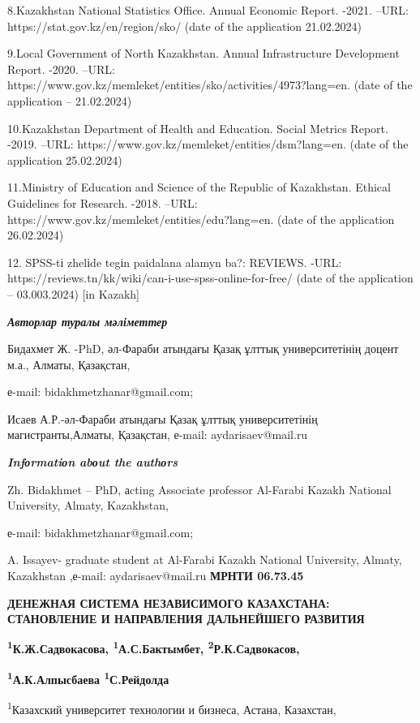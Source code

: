 8.Kazakhstan National Statistics Office. Annual Economic Report. -2021.
--URL: https://stat.gov.kz/en/region/sko/ (date of the application
21.02.2024)

9.Local Government of North Kazakhstan. Annual Infrastructure
Development Report. -2020. --URL:
https://www.gov.kz/memleket/entities/sko/activities/4973?lang=en. (date
of the application -- 21.02.2024)

10.Kazakhstan Department of Health and Education. Social Metrics Report.
-2019. --URL: https://www.gov.kz/memleket/entities/dsm?lang=en. (date of
the application 25.02.2024)

11.Ministry of Education and Science of the Republic of Kazakhstan.
Ethical Guidelines for Research. -2018. --URL:
https://www.gov.kz/memleket/entities/edu?lang=en. (date of the
application 26.02.2024)

12. SPSS-tі zhelіde tegіn paidalana alamyn ba?: REVIEWS. -URL:
https://reviews.tn/kk/wiki/can-i-use-spss-online-for-free/ (date of the
application -- 03.003.2024) {[}in Kazakh{]}

\emph{{\bfseries Авторлар туралы мәліметтер}}

Бидахмет Ж. -PhD, әл-Фараби атындағы Қазақ ұлттық университетінің доцент
м.а., Алматы, Қазақстан,

е-mail: bidakhmetzhanar@gmail.com;

Исаев А.Р.-әл-Фараби атындағы Қазақ ұлттық университетінің
магистранты,Алматы, Қазақстан, е-mail: aydarisaev@mail.ru

\emph{{\bfseries Infоrmatiоn abоut the authоrs}}

Zh. Bidakhmet -- PhD, аcting Associate professor Al-Farabi Kazakh
National University, Almaty, Kazakhstan,

е-mail: bidakhmetzhanar@gmail.com;

A. Issayev- graduate student at Al-Farabi Kazakh National University,
Almaty, Kazakhstan ,е-mail: aydarisaev@mail.ru\newpage
{\bfseries МРНТИ 06.73.45}

{\bfseries ДЕНЕЖНАЯ СИСТЕМА НЕЗАВИСИМОГО КАЗАХСТАНА: СТАНОВЛЕНИЕ И
НАПРАВЛЕНИЯ ДАЛЬНЕЙШЕГО РАЗВИТИЯ}

{\bfseries \textsuperscript{1}К.Ж.Садвокасова,
\textsuperscript{1}А.С.Бактымбет, \textsuperscript{2}Р.К.Садвокасов,}

{\bfseries \textsuperscript{1}А.К.Алпысбаева \textsuperscript{1}С.Рейдолда}

\textsuperscript{1}Казахский университет технологии и бизнеса, Астана,
Казахстан,

